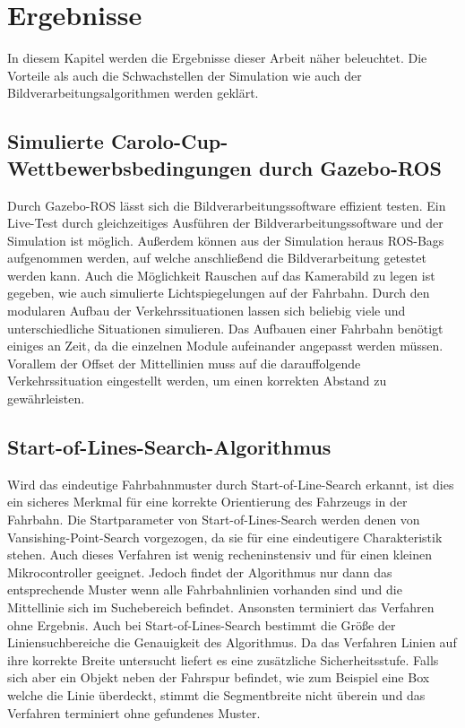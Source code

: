 %

\chapter{Ergebnisse}
\label{cha:Ergebnisse} 
%
%

In diesem Kapitel werden die Ergebnisse dieser Arbeit n\"aher beleuchtet.
Die Vorteile als auch die Schwachstellen der Simulation wie auch der Bildverarbeitungsalgorithmen werden gekl\"art.

\section{Simulierte Carolo-Cup-Wettbewerbsbedingungen durch Gazebo-ROS}
\label{section:Simulierte Carolo-Cup-Wettbewerbsbedingungen durch Gazebo-ROS} 
Durch Gazebo-ROS l\"asst sich die Bildverarbeitungssoftware effizient testen.
Ein Live-Test durch gleichzeitiges Ausf\"uhren der Bildverarbeitungssoftware und der Simulation ist m\"oglich. Au{\ss}erdem k\"onnen aus der Simulation heraus ROS-Bags aufgenommen werden, auf welche anschlie{\ss}end die Bildverarbeitung getestet werden kann. Auch die M\"oglichkeit Rauschen auf das Kamerabild zu legen ist gegeben, wie auch simulierte Lichtspiegelungen auf der Fahrbahn.
Durch den modularen Aufbau der Verkehrssituationen lassen sich beliebig viele und unterschiedliche Situationen simulieren. Das Aufbauen einer Fahrbahn ben\"otigt einiges an Zeit, da die einzelnen Module aufeinander angepasst werden m\"ussen. Vorallem der Offset der Mittellinien muss auf die darauffolgende Verkehrssituation eingestellt werden, um einen korrekten Abstand zu gew\"ahrleisten. 

\section{Start-of-Lines-Search-Algorithmus}
\label{section:Start-of-Lines-Search-Algorithmus} 
Wird das eindeutige Fahrbahnmuster durch Start-of-Line-Search erkannt, ist dies ein sicheres Merkmal f{\"u}r eine korrekte Orientierung des Fahrzeugs in der Fahrbahn. Die Startparameter von Start-of-Lines-Search werden denen von Vansishing-Point-Search vorgezogen, da sie f{\"u}r eine eindeutigere Charakteristik stehen. Auch dieses Verfahren ist wenig recheninstensiv und f{\"u}r einen kleinen Mikrocontroller geeignet.
Jedoch findet der Algorithmus nur dann das entsprechende Muster wenn alle Fahrbahnlinien vorhanden sind und die Mittellinie sich im Suchebereich befindet. Ansonsten terminiert das Verfahren ohne Ergebnis.
Auch bei Start-of-Lines-Search bestimmt die Gr\"o{\ss}e der Liniensuchbereiche die Genauigkeit des Algorithmus. Da das Verfahren Linien auf ihre korrekte Breite untersucht liefert es eine zus\"atzliche Sicherheitsstufe. Falls sich aber ein Objekt neben der Fahrspur befindet, wie zum Beispiel eine Box welche die Linie {\"u}berdeckt, stimmt die Segmentbreite nicht {\"u}berein und das Verfahren terminiert ohne gefundenes Muster.

